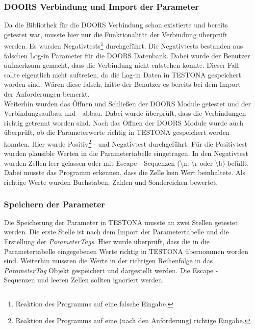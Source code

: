\subsubsection{DOORS Verbindung und Import der Parameter}
Da die Bibliothek für die DOORS Verbindung schon existierte und bereits getestet war, musste hier nur die Funktionalität der Verbindung überprüft werden. Es wurden Negativtests\footnote{Reaktion des Programms auf eine falsche Eingabe.} durchgeführt. Die Negativtests bestanden aus falschen Log-in Parameter für die DOORS Datenbank. Dabei wurde der Benutzer aufmerksam gemacht, dass die Verbindung nicht entstehen konnte. Dieser Fall sollte eigentlich nicht auftreten, da die Log-in Daten in TESTONA gespeichert worden sind. Wären diese falsch, hätte der Benutzer es bereits bei dem Import der Anforderungen bemerkt.\\


Weiterhin wurden das Öffnen und Schließen der DOORS Module getestet und der Verbindungsaufbau und - abbau. Dabei wurde überprüft, dass die Verbindungen richtig getrennt worden sind. Nach das Öffnen der DOORS Module wurde auch überprüft, ob die Parameterwerte richtig in TESTONA gespeichert werden konnten. Hier wurde Positiv\footnote{Reaktion des Programms auf eine (nach den Anforderung) richtige Eingabe.} - und Negativtest durchgeführt. Für die Positivtest wurden plausible Werten in die Parametertabelle eingetragen. In den Negativtest wurden Zellen leer gelassen oder mit Escape - Sequenzen (\textbackslash n, \textbackslash r oder \textbackslash b) befüllt. Dabei musste das Programm erkennen, dass die Zelle kein Wert beinhaltete. Als richtige Werte wurden Buchstaben, Zahlen und Sondereichen bewertet.\\



\subsubsection{Speichern der Parameter}
Die Speicherung der Parameter in TESTONA musste an zwei Stellen getestet werden. Die erste Stelle ist nach dem Import der Parametertabelle und die Erstellung der \textit{ParameterTags}. Hier wurde überprüft, dass die in die Parametertabelle eingegebenen Werte richtig in TESTONA übernommen worden sind. Weiterhin mussten die Werte in der richtigen Reihenfolge in das \textit{ParameterTag} Objekt gespeichert und dargestellt werden. Die Escape - Sequenzen und leeren Zellen sollten ignoriert werden. \\


